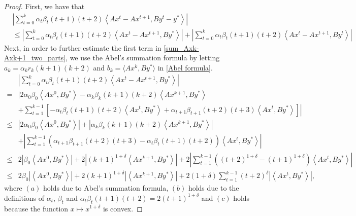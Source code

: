 \documentclass{article}
\numberwithin{equation}{section}
\begin{document}
\begin{proof}
    First, we have that 
    \begin{align}
        &\left| \sum\limits_{t = 0}^k\alpha_t\beta_{t}(t+1)(t+2)\left\langle Ax^t- Ax^{t+1},By^t-y^* \right\rangle \right| \nonumber \\
        &\leq \left| \sum\limits_{t = 0}^k\alpha_t\beta_{t}(t+1)(t+2)\left\langle Ax^t- Ax^{t+1},By^* \right\rangle \right|
        + \left| \sum\limits_{t = 0}^k\alpha_t\beta_{t}(t+1)(t+2)\left\langle Ax^t- Ax^{t+1},By^t \right\rangle \right|
        \label{sum_Axk-Axk+1_two_parts}
    \end{align}
    Next, in order to further estimate the first term in \eqref{sum_Axk-Axk+1_two_parts}, 
    we use the Abel's summation formula by letting $a_k = \alpha_kr_k(k+1)(k+2)$ and $b_k = \langle Ax^k,By^* \rangle$ in \eqref{Abel formula}.
    \begin{align} 
        &\left| \sum\limits_{t = 0}^k\alpha_t\beta_{t}(t+1)(t+2)\left\langle Ax^t- Ax^{t+1},By^* \right\rangle \right| \nonumber \\
        \overset{\mathop{(a)}}{=}& \Bigg| 2\alpha_0\beta_0 \left\langle Ax^0, By^* \right\rangle -\alpha_k\beta_{k}(k+1)(k+2)\left\langle  Ax^{k+1},By^* \right\rangle \nonumber \\
        &+ \left. \sum\limits_{t=1}^{k-1} \left[ -\alpha_t\beta_{t}(t+1)(t+2)\left\langle Ax^t, By^* \right\rangle
        +  \alpha_{t+1}\beta_{t+1}(t+2)(t+3)\left\langle Ax^t, By^* \right\rangle\right] \right|    \nonumber \\
        \leq &\left| 2\alpha_0\beta_0 \left\langle Ax^0, By^* \right\rangle \right| +\left|\alpha_k\beta_{k}(k+1)(k+2)\left\langle  Ax^{k+1},By^* \right\rangle\right| \nonumber \\
        &+\left| \sum\limits_{t=1}^{k-1} \left(\alpha_{t+1}\beta_{t+1}(t+2)(t+3) -\alpha_t\beta_{t}(t+1)(t+2)\right)\left\langle Ax^t, By^* \right\rangle\right| \nonumber \\
        \overset{\mathop{(b)}}{\leq} &2\left| \beta_0 \left\langle Ax^0, By^* \right\rangle \right|
        + 2\left|(k+1)^{1+\delta}\left\langle  Ax^{k+1},By^* \right\rangle\right|
        +2\left| \sum\limits_{t=1}^{k-1} \left((t+2)^{1+\delta} -(t+1)^{1+\delta}\right)\left\langle Ax^t, By^* \right\rangle\right| 
        \nonumber \\ 
        \overset{\mathop{(c)}}{\leq} & 2 \beta_0 \left|\left\langle Ax^0, By^* \right\rangle \right|
        + 2(k+1)^{1+\delta}\left|\left\langle  Ax^{k+1},By^* \right\rangle\right|
        +2(1+\delta) \sum\limits_{t=1}^{k-1} (t+2)^{\delta} \left|\left\langle Ax^t, By^* \right\rangle\right|,  
        \label{Axk_Axk+1,By*}
    \end{align}
    where $(a)$ holds due to Abel's summation formula, $(b)$ holds due to the definitions 
    of $\alpha_t$, $\beta_{t}$ and $\alpha_t\beta_t(t+1)(t+2)=2(t+1)^{1+\delta}$ and $(c)$ holds because
    the function $x \mapsto x^{1+\delta}$ is convex.
    

\end{proof}
\end{document}
